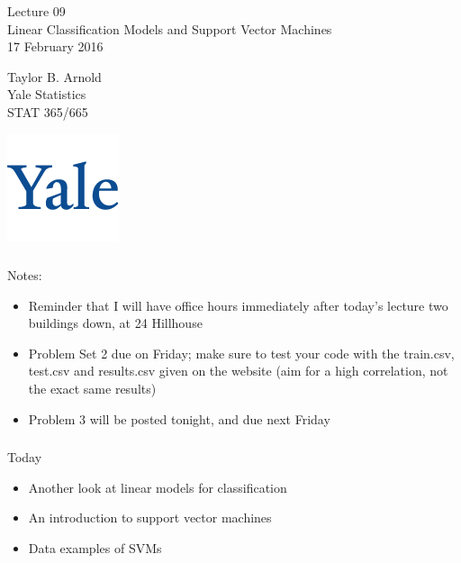 \documentclass[xetex,mathserif,serif,aspectratio=169]{beamer}
\begin{document}
\begin{frame}[fragile] \frametitle{} \oldB \small

\vfill

{\fontsize{0.7cm}{0cm}\selectfont Lecture 09 \\\vspace{0.2cm} Linear Classification Models and Support Vector Machines}\\\vspace{0.5cm}
17 February 2016

\vspace{2cm}

\begin{minipage}{0.6\textwidth}
Taylor B. Arnold \\
Yale Statistics \\
STAT 365/665
\end{minipage}
\hfill
\begin{minipage}{0.3\textwidth}\raggedleft
\includegraphics[scale=0.3]{../yale-logo.png}
\end{minipage}%

\end{frame}

\begin{frame}[fragile] \frametitle{} \oldB \small

Notes:
\begin{itemize}
\item Reminder that I will have office hours immediately after today's lecture
two buildings down, at 24 Hillhouse
\item Problem Set 2 due on Friday; make sure to test your code with the train.csv,
test.csv and results.csv given on the website (aim for a high correlation, not the
exact same results)
\item Problem 3 will be posted tonight, and due next Friday
\end{itemize}

\end{frame}

\begin{frame}[fragile] \frametitle{} \oldB \small

Today
\begin{itemize}
\item Another look at linear models for classification
\item An introduction to support vector machines
\item Data examples of SVMs
\end{itemize}

\end{frame}
\end{document}
